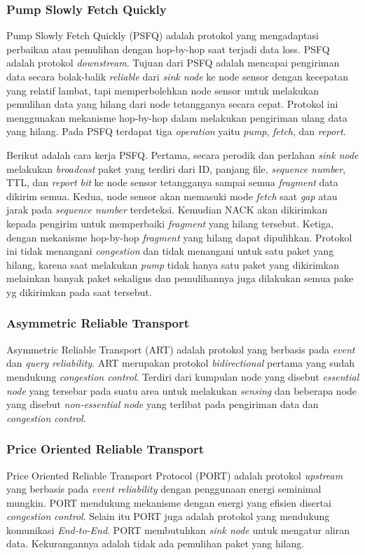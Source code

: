 \subsubsection{Pump Slowly Fetch Quickly}
Pump Slowly Fetch Quickly (PSFQ) adalah protokol yang mengadaptasi perbaikan atau pemulihan dengan hop-by-hop saat terjadi data loss. PSFQ adalah protokol \textit{downstream}. Tujuan dari PSFQ adalah mencapai pengiriman data secara bolak-balik  \textit{reliable} dari \textit{sink node} ke node sensor dengan kecepatan yang relatif lambat, tapi memperbolehkan node sensor untuk melakukan pemulihan data yang hilang dari node tetangganya secara cepat. Protokol ini menggunakan mekanisme hop-by-hop dalam melakukan pengiriman ulang data yang hilang. Pada PSFQ terdapat tiga \textit{operation} yaitu \textit{pump}, \textit{fetch}, dan \textit{report}. 

Berikut adalah cara kerja PSFQ. Pertama, secara perodik dan perlahan \textit{sink node} melakukan \textit{broadcast} paket yang terdiri dari ID, panjang file, \textit{sequence number}, TTL, dan \textit{report bit} ke node sensor tetangganya sampai semua \textit{fragment} data dikirim semua. Kedua, node sensor akan memasuki mode \textit{fetch} saat \textit{gap} atau jarak pada \textit{sequence number} terdeteksi. Kemudian NACK akan dikirimkan kepada pengirim untuk memperbaiki \textit{fragment} yang hilang tersebut. Ketiga, dengan mekanisme hop-by-hop \textit{fragment} yang hilang dapat dipulihkan. Protokol ini tidak menangani \textit{congestion} dan tidak menangani untuk satu paket yang hilang, karena saat melakukan \textit{pump} tidak hanya satu paket yang dikirimkan melainkan banyak paket sekaligus dan pemulihannya juga dilakukan semua pake yg dikirimkan pada saat tersebut.

\subsubsection{Asymmetric Reliable Transport}
Asymmetric Reliable Transport (ART) adalah protokol yang berbasis pada \textit{event} dan \textit{query reliability}. ART merupakan protokol \textit{bidirectional} pertama yang sudah mendukung \textit{congestion control}. Terdiri dari kumpulan node yang disebut \textit{essential node} yang tersebar pada suatu area untuk melakukan \textit{sensing} dan beberapa node yang disebut \textit{non-essential node} yang terlibat pada pengiriman data dan \textit{congestion control}.

\subsubsection{Price Oriented Reliable Transport}
Price Oriented Reliable Transport Protocol (PORT) adalah protokol \textit{upstream} yang berbasis pada \textit{event reliability} dengan penggunaan energi seminimal mungkin. PORT mendukung mekanisme dengan energi yang efisien disertai \textit{congestion control}. Selain itu PORT juga adalah protokol yang mendukung komunikasi \textit{End-to-End}. PORT membutuhkan \textit{sink node} untuk mengatur aliran data. Kekurangannya adalah tidak ada pemulihan paket yang hilang.

